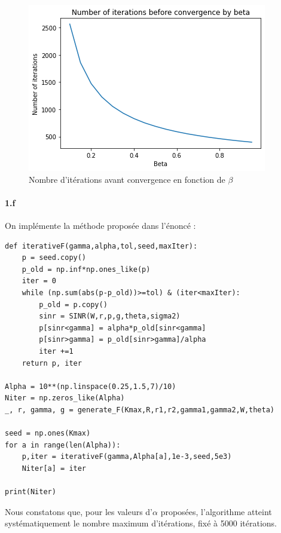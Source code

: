 \documentclass[a4paper,11pt,2]{article}
\begin{document}
\begin{figure}[h]
\centering
\includegraphics[width=0.7\linewidth]{./Images/II-1e.png}
\caption{Nombre d'itérations avant convergence en fonction de $\beta$}
\label{fig:II1e}
\end{figure}

\paragraph{1.f} On implémente la méthode proposée dans l'énoncé :
\begin{center}
\begin{lstlisting}
def iterativeF(gamma,alpha,tol,seed,maxIter):
    p = seed.copy()
    p_old = np.inf*np.ones_like(p)
    iter = 0
    while (np.sum(abs(p-p_old))>=tol) & (iter<maxIter):
        p_old = p.copy()
        sinr = SINR(W,r,p,g,theta,sigma2)
        p[sinr<gamma] = alpha*p_old[sinr<gamma]
        p[sinr>gamma] = p_old[sinr>gamma]/alpha
        iter +=1
    return p, iter

Alpha = 10**(np.linspace(0.25,1.5,7)/10)
Niter = np.zeros_like(Alpha)
_, r, gamma, g = generate_F(Kmax,R,r1,r2,gamma1,gamma2,W,theta)

seed = np.ones(Kmax)
for a in range(len(Alpha)):
    p,iter = iterativeF(gamma,Alpha[a],1e-3,seed,5e3)
    Niter[a] = iter

print(Niter)
\end{lstlisting}
\end{center}

Nous constatons que, pour les valeurs d'$\alpha$ proposées, l'algorithme atteint systématiquement le nombre maximum d'itérations, fixé à 5000 itérations.
\end{document}

